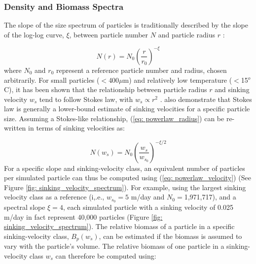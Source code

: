 \documentclass[draft,linenumbers]{agujournal2018}
\begin{document}
\subsubsection{Density and Biomass Spectra}
\label{sec: equations_biomass}
The slope of the size spectrum of particles is traditionally described by the slope of the log-log curve, $\xi$, between particle number $N$ and particle radius $r$ \citep[also know as the Junge slope;][]{White_2015}:

\begin{equation}
N(r) = N_0 \left(\frac{r}{r_0}\right)^{-\xi}
\label{eq: powerlaw_radius}
\end{equation}
where $N_0$ and $r_0$ represent a reference particle number and radius, chosen arbitrarily. For small particles ($<$400$\mu$m) and relatively low temperature ($<$15$^o$C), it has been shown that the relationship between particle radius $r$ and sinking velocity $w_s$ tend to follow Stokes law, with $w_s \propto r^2$ \citep{Bach_2012}. \cite{Bach_2012} also demonstrate that Stokes law is generally a lower-bound estimate of sinking velocities for a specific particle size. Assuming a Stokes-like relationship, (\ref{eq: powerlaw_radius}) can be re-written in terms of sinking velocities as:

\begin{equation}
N(w_s) = N_0 \left(\frac{w_s}{w_{s_0}}\right)^{-\xi/2}
\label{eq: powerlaw_velocity}
\end{equation}
For a specific slope and sinking-velocity class, an equivalent number of particles per simulated particle can thus be computed using (\ref{eq: powerlaw_velocity}) (See Figure \ref{fig: sinking_velocity_spectrum}). For example, using the largest sinking velocity class as a reference (i,.e., $w_{s_0} = 5$ m/day and $N_0=$1,971,717), and a spectral slope $\xi = 4$, each simulated particle with a sinking velocity of 0.025 m/day in fact represent 40,000 particles (Figure \ref{fig: sinking_velocity_spectrum}). The relative biomass of a particle in a specific sinking-velocity class, $B_p(w_s)$, can be estimated if the biomass is assumed to vary with the particle's volume. The relative biomass of one particle in a sinking-velocity class $w_s$ can therefore be computed using:
\end{document}
